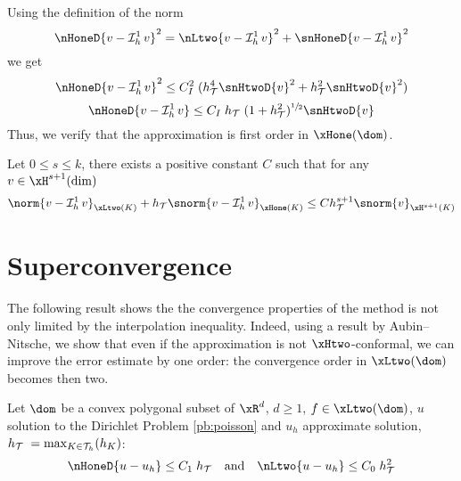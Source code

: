 \begin{rmrk}
Using the definition of the norm
\begin{equation*}
\nHoneD{v - \Lgrh{1} v}^2 = \nLtwo{v - \Lgrh{1} v}^2 + \snHoneD{v - \Lgrh{1} v}^2
\end{equation*}
we get
\begin{equation*}
\nHoneD{v - \Lgrh{1} v}^2 \leq C_I^2\; (\sizeT^4 \snHtwoD{v}^2 + \sizeT^2 \snHtwoD{v}^2)
\end{equation*}
\begin{equation*}
\nHoneD{v - \Lgrh{1} v} \leq C_I\; \sizeT\;(1 + \sizeT^2)^{\sfrac{1}{2}} \snHtwoD{v}
\end{equation*}
Thus, we verify that the approximation is first order in $\xHone(\dom)$.
\end{rmrk}

\begin{prpstn}
Let $0\leq s \leq k$, there exists a positive constant $C$ such that for any $v\in\xH^{s+1}(\dim)$
\begin{equation*}
\norm{v-\Lgrh{1}v}_{\xLtwo(K)} + \sizeT \snorm{v-\Lgrh{1}v}_{\xHone(K)}\leq C \sizeT^{s+1}\snorm{v}_{\xH^{s+1}(K)}
\end{equation*}
\end{prpstn}

\section{Superconvergence}

The following result shows the the convergence properties of the method is not only limited by the interpolation inequality.
Indeed, using a result by Aubin--Nitsche, we show that even if the approximation is not $\xHtwo$-conformal, we can improve the error estimate by one order: the convergence order in $\xLtwo(\dom)$ becomes then two.

\begin{thrm}[Superconvergence]
Let $\dom$ be a convex polygonal subset of $\xR^d$, $d \geq 1$, $f \in \xLtwo(\dom)$, $u$ solution to the Dirichlet Problem \eqref{pb:poisson} and $u_h$ approximate solution, $h_{\mathcal T}\;= \max_{K\in{\mathcal T}_h}(h_K)$:
\begin{equation*}
\nHoneD{u - u_h}  \leq C_1\;\sizeT\quad\mbox{and}\quad\nLtwo{u - u_h}  \leq C_0\;\sizeT^2
\end{equation*}
\end{thrm}

